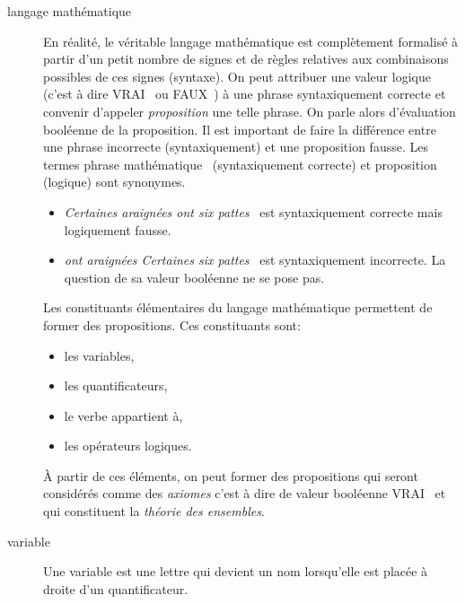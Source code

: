 \begin{description}
 \item[langage mathématique]  En réalité, le véritable langage mathématique est complètement formalisé à partir d'un petit nombre de signes et de règles relatives aux combinaisons possibles de ces signes (syntaxe). On peut attribuer une valeur logique (c'est à dire \og VRAI\fg~ ou \og FAUX\fg~) à une phrase syntaxiquement correcte et convenir d'appeler \emph{proposition} une telle phrase. On parle alors d'évaluation booléenne de la proposition.\newline
 Il est important de faire la différence entre une phrase incorrecte (syntaxiquement) et une proposition fausse. Les termes \og phrase mathématique\fg~  (syntaxiquement correcte) et proposition (logique) sont synonymes.
\begin{itemize}
 \item \og\emph{Certaines araignées ont six pattes}\fg~ est syntaxiquement correcte mais logiquement fausse.
 \item \og\emph{ont araignées Certaines six  pattes}\fg~ est syntaxiquement incorrecte. La question de sa valeur booléenne ne se pose pas.
\end{itemize}
Les constituants élémentaires du langage mathématique permettent de former des propositions. Ces constituants sont:
\begin{itemize}
 \item les variables,
 
 \item les quantificateurs,

 \item le verbe \og appartient à\fg,
 
 \item les opérateurs logiques.
\end{itemize}
\`A partir de ces éléments, on peut former des propositions qui seront considérés comme des \emph{axiomes} c'est à dire de valeur booléenne \og VRAI\fg~ et qui constituent la \emph{théorie des ensembles}.

\item[variable] Une variable est une lettre qui devient un nom lorsqu'elle est placée à droite d'un quantificateur.


\end{description}
